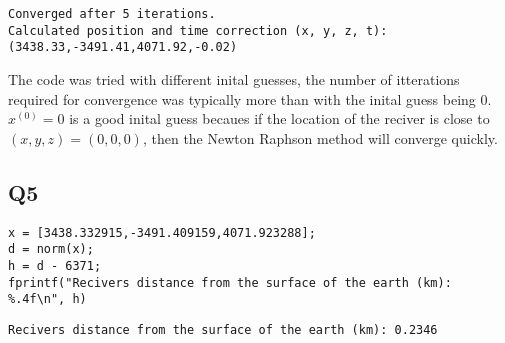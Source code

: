 \documentclass[11pt]{article}
\begin{document}
\label{Q4}
\begin{verbatim}
Converged after 5 iterations.
Calculated position and time correction (x, y, z, t): (3438.33,-3491.41,4071.92,-0.02)
\end{verbatim}


The code was tried with different inital guesses, the number of itterations required for convergence was typically more than with the inital guess being 0. \(x^{(0)}=0\) is a good inital guess becaues if the location of the reciver is close to \((x,y,z)=(0,0,0)\), then the Newton Raphson method will converge quickly.
\subsection{Q5}
\label{sec:org0686e9a}
\begin{verbatim}
x = [3438.332915,-3491.409159,4071.923288];
d = norm(x);
h = d - 6371;
fprintf("Recivers distance from the surface of the earth (km): %.4f\n", h)
\end{verbatim}

\label{Q5}
\begin{verbatim}
Recivers distance from the surface of the earth (km): 0.2346
\end{verbatim}
\end{document}
